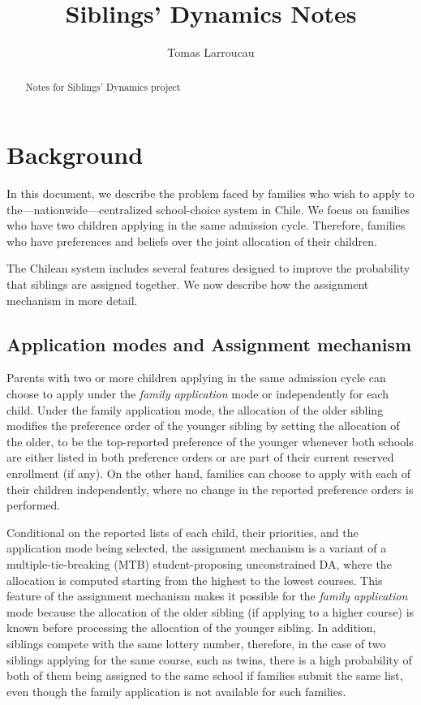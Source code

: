\documentclass{article}
\title{Siblings' Dynamics Notes}
\author{Tomas Larroucau}
\begin{document}
\maketitle

\begin{abstract}
Notes for Siblings' Dynamics project
\end{abstract}

\section{Background}

In this document, we describe the problem faced by families who wish to apply to the---nationwide---centralized school-choice system in Chile. We focus on families who have two children applying in the same admission cycle. Therefore, families who have preferences and beliefs over the joint allocation of their children. 

The Chilean system includes several features designed to improve the probability that siblings are assigned together. We now describe how the assignment mechanism in more detail.

\subsection{Application modes and Assignment mechanism}

Parents with two or more children applying in the same admission cycle can choose to apply under the \textit{family application} mode or independently for each child. Under the family application mode, the allocation of the older sibling modifies the preference order of the younger sibling by setting the allocation of the older, to be the top-reported preference of the younger whenever both schools are either listed in both preference orders or are part of their current reserved enrollment (if any). On the other hand, families can choose to apply with each of their children independently, where no change in the reported preference orders is performed.

Conditional on the reported lists of each child, their priorities, and the application mode being selected, the assignment mechanism is a variant of a multiple-tie-breaking (MTB) student-proposing unconstrained DA, where the allocation is computed starting from the highest to the lowest courses. This feature of the assignment mechanism makes it possible for the \textit{family application} mode because the allocation of the older sibling (if applying to a higher course) is known before processing the allocation of the younger sibling. In addition, siblings compete with the same lottery number, therefore,  in the case of two siblings applying for the same course, such as twins, there is a high probability of both of them being assigned to the same school if families submit the same list, even though the family application is not available for such families.
\end{document}
